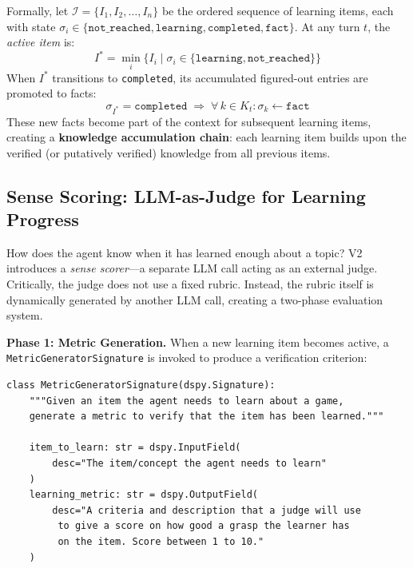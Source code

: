 \documentclass[11pt,letterpaper]{article}
\begin{document}
Formally, let $\mathcal{I} = \{I_1, I_2, \ldots, I_n\}$ be the ordered sequence of learning items, each with state $\sigma_i \in \{\texttt{not\_reached}, \texttt{learning}, \texttt{completed}, \texttt{fact}\}$. At any turn $t$, the \emph{active item} is:
\begin{equation}
  I^* = \min_{i} \{I_i \mid \sigma_i \in \{\texttt{learning}, \texttt{not\_reached}\}\}
  \label{eq:active}
\end{equation}
When $I^*$ transitions to \texttt{completed}, its accumulated figured-out entries are promoted to facts:
\begin{equation}
  \sigma_{I^*} = \texttt{completed} \;\Longrightarrow\; \forall\, k \in K_t : \sigma_k \leftarrow \texttt{fact}
  \label{eq:promotion}
\end{equation}
These new facts become part of the context for subsequent learning items, creating a \textbf{knowledge accumulation chain}: each learning item builds upon the verified (or putatively verified) knowledge from all previous items.

\subsection{Sense Scoring: LLM-as-Judge for Learning Progress}
\label{sec:sense}

How does the agent know when it has learned enough about a topic? V2 introduces a \emph{sense scorer}---a separate LLM call acting as an external judge. Critically, the judge does not use a fixed rubric. Instead, the rubric itself is dynamically generated by another LLM call, creating a two-phase evaluation system.

\textbf{Phase 1: Metric Generation.} When a new learning item becomes active, a \texttt{Metric\-Generator\-Signature} is invoked to produce a verification criterion:
\begin{lstlisting}[caption={Dynamic metric generation via DSPy.},label=lst:metricgen]
class MetricGeneratorSignature(dspy.Signature):
    """Given an item the agent needs to learn about a game,
    generate a metric to verify that the item has been learned."""

    item_to_learn: str = dspy.InputField(
        desc="The item/concept the agent needs to learn"
    )
    learning_metric: str = dspy.OutputField(
        desc="A criteria and description that a judge will use
         to give a score on how good a grasp the learner has
         on the item. Score between 1 to 10."
    )
\end{lstlisting}
\end{document}
